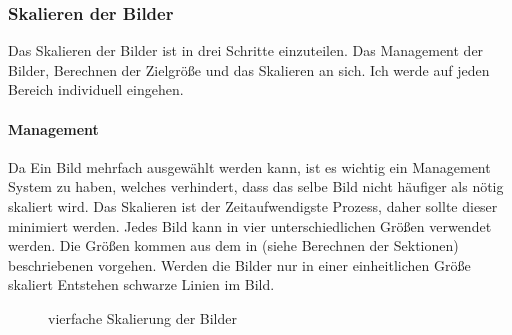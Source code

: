 \newpage

\subsubsection{Skalieren der Bilder}
Das Skalieren der Bilder ist in drei Schritte einzuteilen. Das Management der Bilder, Berechnen der Zielgröße und das Skalieren an sich. Ich werde auf jeden Bereich individuell eingehen.

\paragraph{Management}
Da Ein Bild mehrfach ausgewählt werden kann, ist es wichtig ein Management System zu haben, welches verhindert, dass das selbe Bild nicht häufiger als nötig skaliert wird. Das Skalieren ist der Zeitaufwendigste Prozess, daher sollte dieser minimiert werden. Jedes Bild kann in vier unterschiedlichen Größen verwendet werden. Die Größen kommen aus dem in (siehe Berechnen der Sektionen) beschriebenen vorgehen. Werden die Bilder nur in einer einheitlichen Größe skaliert Entstehen schwarze Linien im Bild.

\begin{figure}[h]
    \centering
    \caption[Schwarze Linien]{vierfache Skalierung der Bilder}
\end{figure}


